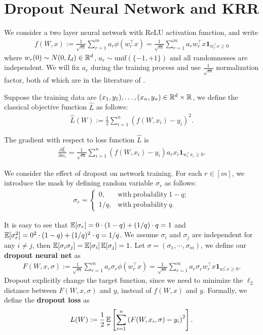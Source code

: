 


\newpage
\section{Dropout Neural Network and KRR}\label{sec:dropout_KRR}
\label{sec:notation1}
We consider a two layer neural network with ReLU activation function, and write 
\begin{align}
\label{eq:pb2}
f(W, x) := \frac{1}{\sqrt{m}}\sum_{r = 1}^{m}a_r \phi(w_{r}^{\top}x) = \frac{1}{\sqrt{m}}\sum_{r = 1}^{m}a_r w_{r}^{\top}x \mathbf{1}_{w_{r}^{\top}x\geq 0}
\end{align}
where $w_r(0) \sim N(0, I_d) \in \mathbb{R}^d$, $a_{r} \sim \mathrm{unif}(\{-1, +1\})$ and all randomnesses are independent. We will fix $a_r$ during the training process and use $\frac{1}{\sqrt{m}}$ normalization factor, both of which are in the literature of \cite{dzps19,sy19,bpsw21}.

Suppose the training data are $(x_1,y_1), \ldots, (x_n, y_n) \in \mathbb{R}^{d}\times \mathbb{R}$, we define the classical objective function $\hat{L}$ as follows:
\begin{align*}
\hat{L}(W) := \frac{1}{2}\sum_{i = 1}^{n}\left(f(W, x_i) - y_i\right)^2.
\end{align*}

The gradient with respect to loss function $\hat{L}$ is %
\begin{align*}
\frac{\partial \hat{L}}{\partial w_r} = \frac{1}{\sqrt{m}}\sum_{i=1}^{n} (f(W, x_i) - y_i)a_r x_i\mathbf{1}_{w_r^{\top}x_i \geq 0}.
\end{align*}


We consider the effect of dropout on network training. For each $r \in [m]$, we introduce the mask by defining random variable $\sigma_{r}$ as follows:
\begin{align*}
\sigma_r = 
\begin{cases}
0, & \mathrm{with~probability~} 1-q ; \\
1/q, & \mathrm{with~probability~} q .
\end{cases}
\end{align*}

It is easy to see that $\operatorname*{{\mathbb{E}}}[ \sigma_r ] = 0 \cdot (1-q) + (1/q) \cdot q = 1$ and $\operatorname*{{\mathbb{E}}}[ \sigma_r^2 ] = 0^2 \cdot (1-q) + (1/q)^2 \cdot q = 1/q$. %
We assume $\sigma_i$ and $\sigma_j$ are independent for any $i\neq j$, then $\operatorname*{{\mathbb{E}}}[\sigma_i\sigma_j] = \operatorname*{{\mathbb{E}}}[\sigma_i]\operatorname*{{\mathbb{E}}}[\sigma_j]=1$. Let $\sigma = (\sigma_1,\cdots, \sigma_m)$, we define our \textbf{dropout neural net} as
\begin{align}
\label{eq:pb1}
F(W, x, \sigma) := \frac{1}{\sqrt{m}}\sum_{r = 1}^{m}a_r \sigma_r\phi(w_{r}^{\top}x) = \frac{1}{\sqrt{m}}\sum_{r = 1}^{m}a_r\sigma_r w_{r}^{\top}x \mathbf{1}_{w_{r}^{\top}x\geq 0}.
\end{align}
Dropout explicitly change the target function, since we need to minimize the $\ell_2$ distance between $F(W, x, \sigma)$ and $y$, instead of $f(W, x)$ and $y$. Formally, we define the \textbf{dropout loss} as %
\begin{align}
\label{eq:dropout_loss_def}
L(W) := \frac{1}{2}\operatorname*{{\mathbb{E}}}_{\sigma}\left[\sum_{i = 1}^{n}\left(F(W, x_i, \sigma) - y_i\right)^2\right].
\end{align}

